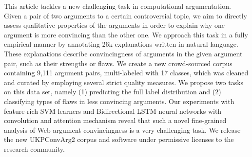 This article tackles a new challenging task in computational argumentation. Given a pair of two arguments to a certain controversial topic, we aim to directly assess qualitative properties of the arguments in order to explain why one argument is more convincing than the other one. We approach this task in a fully empirical manner by annotating 26k explanations written in natural language. These explanations describe convincingness of arguments in the given argument pair, such as their strengths or flaws. We create a new crowd-sourced corpus containing 9,111 argument pairs, multi-labeled with 17 classes, which was cleaned and curated by employing several strict quality measures. We propose two tasks on this data set, namely (1) predicting the full label distribution and (2) classifying types of flaws in less convincing arguments. Our experiments with feature-rich SVM learners and Bidirectional LSTM neural networks with convolution and attention mechanism reveal that such a novel fine-grained analysis of Web argument convincingness is a very challenging task. We release the new UKPConvArg2 corpus and software under permissive licenses to the research community.
